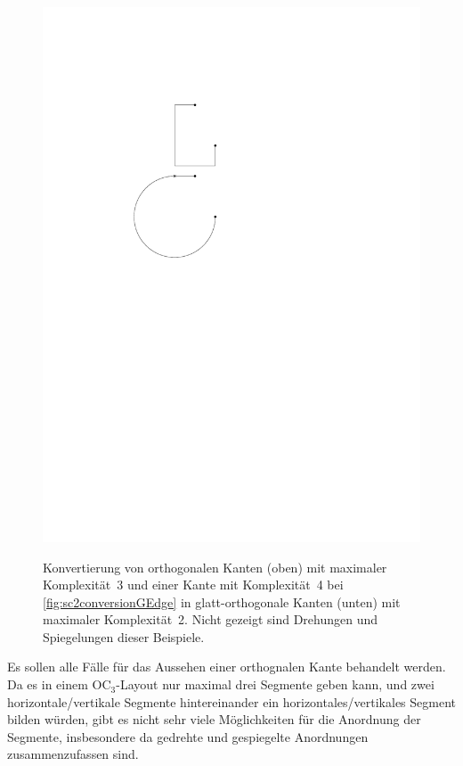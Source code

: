 \documentclass[a4paper]{scrreprt}
\theoremstyle{definition}
\begin{document}
\begin{figure}[h]
            {\includegraphics[scale=.8]{sc2_conversion/GEdge}}
        \quad

        \caption{Konvertierung von orthogonalen Kanten (oben) mit maximaler Komplexität~3 und einer Kante mit Komplexität~4 bei \ref{fig:sc2conversionGEdge} in glatt-orthogonale Kanten (unten) mit maximaler Komplexität~2. Nicht gezeigt sind Drehungen und Spiegelungen dieser Beispiele.}
        \label{fig:sc2conversion}
\end{figure}

Es sollen alle Fälle für das Aussehen einer orthognalen Kante behandelt werden. Da es in einem OC$_3$-Layout nur maximal drei Segmente geben kann, und zwei horizontale/vertikale Segmente hintereinander ein horizontales/vertikales Segment bilden würden, gibt es nicht sehr viele Möglichkeiten für die Anordnung der Segmente, insbesondere da gedrehte und gespiegelte Anordnungen zusammenzufassen sind.
\end{document}
